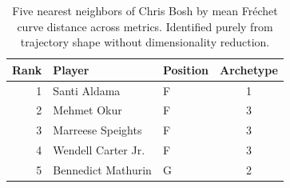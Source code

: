 \begin{table}[htbp]
  \centering\small
  \begin{tabular}{rllc}
    \toprule
    Rank & Player & Position & Archetype \\
    \midrule
    1 & Santi Aldama & F & 1 \\
    2 & Mehmet Okur & F & 3 \\
    3 & Marreese Speights & F & 3 \\
    4 & Wendell Carter Jr. & F & 3 \\
    5 & Bennedict Mathurin & G & 2 \\
    \bottomrule
  \end{tabular}
  \caption{Five nearest neighbors of Chris Bosh by mean Fr\'{e}chet curve distance across metrics. Identified purely from trajectory shape without dimensionality reduction.}
  \label{tab:Chris_Bosh_frechet_curve_neighbors}
\end{table}

